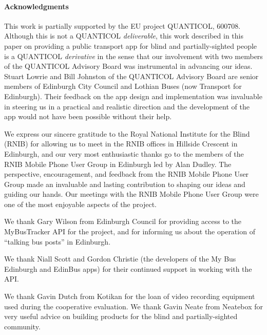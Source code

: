\documentclass[10pt,twocolumn]{article}
\begin{document}
\paragraph{Acknowledgments}

This work is partially supported by the EU project QUANTICOL, 600708.
Although this is not a QUANTICOL \emph{deliverable}, this work described in this paper on providing a public transport app for blind and partially-sighted people is a QUANTICOL \emph{derivative} in the sense that our involvement with two members of the QUANTICOL  Advisory Board was instrumental in advancing our ideas.  Stuart Lowrie and Bill Johnston of the QUANTICOL Advisory Board are senior members of Edinburgh City Council and Lothian Buses (now Transport for Edinburgh).  Their feedback on the app design and implementation was invaluable in steering us in a practical and realistic direction and the development of the app would not have been possible without their help.

We express our sincere gratitude to the Royal National Institute for the Blind (RNIB) for allowing us to meet in the RNIB offices in Hillside Crescent in Edinburgh, and our very most enthusiastic thanks go to the members of the RNIB Mobile Phone User Group in Edinburgh led by Alan Dudley. The perspective, encouragement, and feedback from the RNIB Mobile Phone User Group made an invaluable and lasting contribution to shaping our ideas and guiding our hands.  Our meetings with the RNIB Mobile Phone User Group were one of the most enjoyable aspects of the project.

We thank Gary Wilson from Edinburgh Council for providing access to the MyBusTracker API for the project, and for informing us about the operation of ``talking bus posts'' in Edinburgh.  

We thank Niall Scott and Gordon Christie (the developers of the My Bus Edinburgh and EdinBus apps) for their continued support in working with the API.

We thank Gavin Dutch from Kotikan for the loan of  video recording equipment used during the cooperative evaluation.  We thank Gavin Neate from Neatebox for very useful advice on building products for the blind and partially-sighted community.



 
\end{document}
